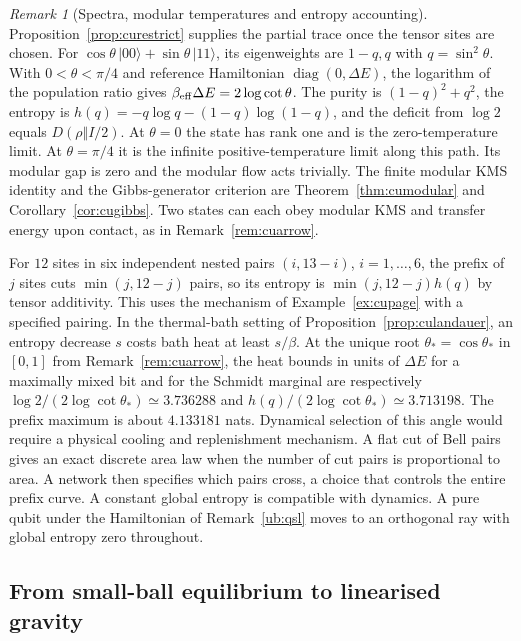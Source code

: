 \documentclass[aps,pra,onecolumn,superscriptaddress,nofootinbib,10pt]{revtex4-2}
\theoremstyle{definition}
\theoremstyle{remark}
\newtheorem{remark}[theorem]{Remark}
\begin{document}
\begin{remark}[Spectra, modular temperatures and entropy accounting]\label{ub:thermo}
Proposition~\ref{prop:curestrict} supplies the partial trace once the
tensor sites are chosen. For
$\cos\theta\,|00\rangle+\sin\theta\,|11\rangle$, its eigenweights
are $1-q,q$ with $q=\sin^2\theta$. With $0<\theta<\pi/4$ and reference
Hamiltonian $\operatorname{diag}(0,\Delta E)$, the logarithm of the
population ratio gives $\beta_{\rm eff}\Delta E=2\log\cot\theta$.
The purity is $(1-q)^2+q^2$, the entropy is
$h(q)=-q\log q-(1-q)\log(1-q)$, and the deficit from $\log2$ equals
$D(\rho\Vert I/2)$. At $\theta=0$ the state has rank one and is
the zero-temperature limit. At $\theta=\pi/4$ it is the infinite
positive-temperature limit along this path. Its modular gap is zero
and the modular flow acts trivially. The finite modular KMS identity
and the Gibbs-generator criterion are Theorem~\ref{thm:cumodular}
and Corollary~\ref{cor:cugibbs}. Two states can each obey modular KMS
and transfer energy upon contact, as in Remark~\ref{rem:cuarrow}.

For $12$ sites in six independent nested pairs $(i,13-i)$,
$i=1,\ldots,6$, the prefix of $j$ sites cuts $\min(j,12-j)$ pairs,
so its entropy is $\min(j,12-j)h(q)$ by tensor additivity. This
uses the mechanism of Example~\ref{ex:cupage} with a specified
pairing. In the thermal-bath setting of
Proposition~\ref{prop:culandauer}, an entropy decrease $s$ costs bath
heat at least $s/\beta$. At the unique root $\theta_*=\cos\theta_*$ in
$[0,1]$ from Remark~\ref{rem:cuarrow}, the heat bounds in units of
$\Delta E$ for a maximally mixed bit and for the Schmidt marginal
are respectively $\log2/(2\log\cot\theta_*)\simeq3.736288$ and
$h(q)/(2\log\cot\theta_*)\simeq3.713198$. The prefix maximum is
about $4.133181$ nats. Dynamical selection of this angle would require
a physical cooling and replenishment mechanism. A flat cut of Bell
pairs gives an exact discrete area law when the number of cut pairs
is proportional to area. A network then specifies which pairs
cross, a choice that controls the entire prefix curve. A constant global
entropy is compatible with dynamics. A pure qubit under the
Hamiltonian of Remark~\ref{ub:qsl} moves to an orthogonal ray with
global entropy zero throughout.
\end{remark}

\subsection{From small-ball equilibrium to linearised gravity}
\end{document}
